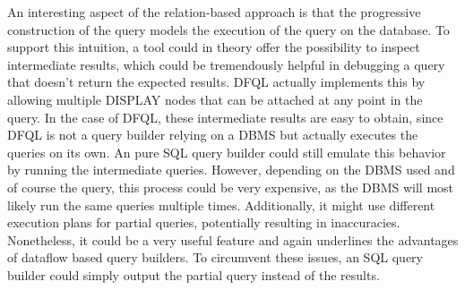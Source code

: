 \documentclass[11pt,a4paper]{globis-book}
\begin{document}
An interesting aspect of the relation-based approach is that the progressive construction of the query models the execution of the query on the database. To support this intuition, a tool could in theory offer the possibility to inspect intermediate results, which could be tremendously helpful in debugging a query that doesn't return the expected results. DFQL actually implements this by allowing multiple DISPLAY nodes that can be attached at any point in the query. In the case of DFQL, these intermediate results are easy to obtain, since DFQL is not a query builder relying on a DBMS but actually executes the queries on its own. An pure SQL query builder could still emulate this behavior by running the intermediate queries. However, depending on the DBMS used and of course the query, this process could be very expensive, as the DBMS will most likely run the same queries multiple times. Additionally, it might use different execution plans for partial queries, potentially resulting in inaccuracies. Nonetheless, it could be a very useful feature and again underlines the advantages of dataflow based query builders. To circumvent these issues, an SQL query builder could simply output the partial query instead of the results.
\end{document}
